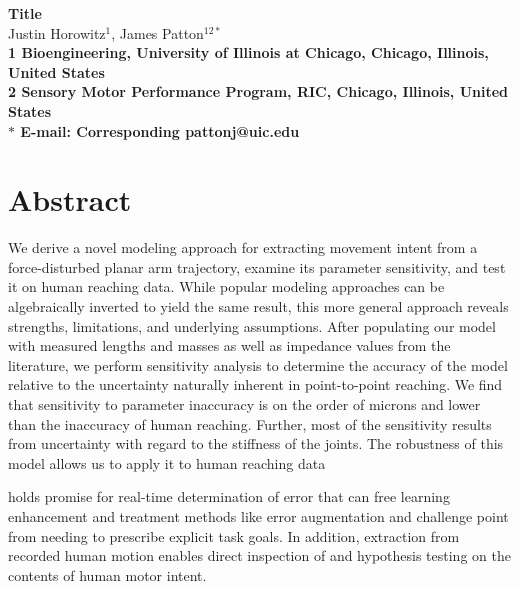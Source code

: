 \documentclass[10pt]{article}
\date{}
\begin{document}
\begin{flushleft}
{\Large
\textbf{Title}
}
\\
Justin Horowitz$^{1}$, 
James Patton$^{12\ast}$
\\
\bf{1} Bioengineering, University of Illinois at Chicago, Chicago, Illinois, United States
\\
\bf{2} Sensory Motor Performance Program, RIC, Chicago, Illinois, United States
\\
$\ast$ E-mail: Corresponding pattonj@uic.edu
\end{flushleft}

\section*{Abstract}
We derive a novel modeling approach for extracting movement intent from a force-disturbed planar arm trajectory, examine its parameter sensitivity, and test it on human reaching data. While popular modeling approaches can be algebraically inverted to yield the same result, this more general approach reveals strengths, limitations, and underlying assumptions. After populating our model with measured lengths and masses as well as impedance values from the literature, we perform sensitivity analysis to determine the accuracy of the model relative to the uncertainty naturally inherent in point-to-point reaching. We find that sensitivity to parameter inaccuracy is on the order of microns and lower than the inaccuracy of human reaching. Further, most of the sensitivity results from uncertainty with regard to the stiffness of the joints. The robustness of this model allows us to apply it to human reaching data

holds promise for real-time determination of error that can free learning enhancement and treatment methods like error augmentation and challenge point from needing to prescribe explicit task goals. In addition, extraction from recorded human motion enables direct inspection of and hypothesis testing on the contents of human motor intent.
\end{document}
